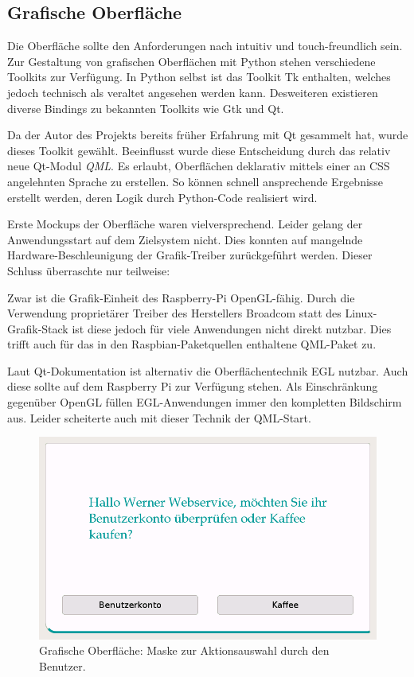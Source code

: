 \documentclass[11pt,a4paper]{IEEEtran}
\begin{document}
\subsection{Grafische Oberfläche} 
\label{sec:gui}

Die Oberfläche sollte den Anforderungen nach intuitiv und touch-freundlich
sein. Zur Gestaltung von grafischen Oberflächen mit Python stehen verschiedene
Toolkits zur Verfügung. In Python selbst ist das Toolkit Tk enthalten, welches
jedoch technisch als veraltet angesehen werden kann. Desweiteren existieren
diverse Bindings zu bekannten Toolkits wie Gtk und Qt. 

Da der Autor des Projekts bereits früher Erfahrung mit Qt gesammelt hat, wurde 
dieses Toolkit gewählt. Beeinflusst wurde diese Entscheidung durch das relativ
neue Qt-Modul \emph{QML}. Es erlaubt, Oberflächen deklarativ mittels einer an
CSS angelehnten Sprache zu erstellen. So können schnell ansprechende Ergebnisse
erstellt werden, deren Logik durch Python-Code realisiert wird.

Erste Mockups der Oberfläche waren vielversprechend. Leider gelang der 
Anwendungsstart auf dem Zielsystem nicht. Dies konnten auf mangelnde 
Hardware-Beschleunigung der Grafik-Treiber zurückgeführt werden. Dieser Schluss
überraschte nur teilweise: 

Zwar ist die Grafik-Einheit des Raspberry-Pi OpenGL-fähig. Durch die Verwendung
proprietärer Treiber des Herstellers Broadcom statt des Linux-Grafik-Stack ist
diese jedoch für viele Anwendungen nicht direkt nutzbar. Dies trifft auch für
das in den Raspbian-Paketquellen enthaltene QML-Paket zu.

Laut Qt-Dokumentation ist alternativ die Oberflächentechnik EGL nutzbar. Auch
diese sollte auf dem Raspberry Pi zur Verfügung stehen. Als Einschränkung 
gegenüber OpenGL füllen EGL-Anwendungen immer den kompletten Bildschirm aus.
Leider scheiterte auch mit dieser Technik der QML-Start.

\begin{figure}[htb]
    \centering
    \includegraphics[width=.9\columnwidth]{images/screenshot}
    \caption{Grafische Oberfläche: Maske zur Aktionsauswahl durch den Benutzer.}
    \label{fig:qt}
\end{figure}
\end{document}
